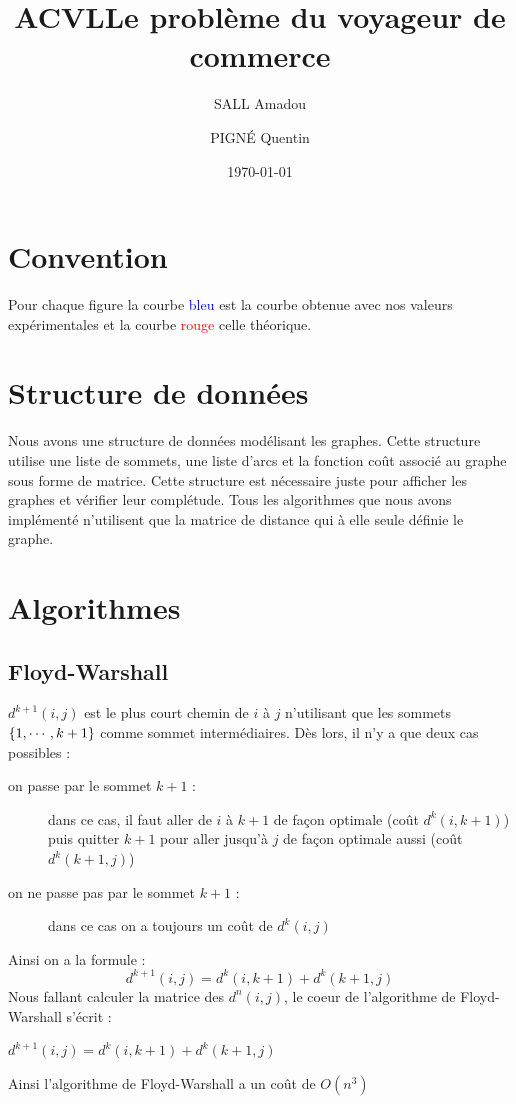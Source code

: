 \documentclass[11pt]{article} \usepackage[top=2cm, bottom=2cm, left=2cm, right=2cm]{geometry}
\title{ACVL} \title{Le problème du voyageur de commerce} \author{SALL Amadou \and PIGN\'E Quentin } \date{\today}
\begin{document}
\maketitle
\section{Convention}
Pour chaque figure la courbe \textcolor{blue}{bleu} est la courbe obtenue avec nos valeurs expérimentales et la courbe \textcolor{red}{rouge} celle théorique.
\section{Structure de données}
Nous avons une structure de données modélisant les graphes. Cette structure utilise une liste de sommets, une liste
d'arcs et la fonction coût associé au graphe sous forme de matrice. Cette structure est nécessaire juste pour afficher
les graphes et vérifier leur complétude. Tous les algorithmes que nous avons implémenté n'utilisent que la matrice de
distance qui à elle seule définie le graphe.
\section{Algorithmes}

\subsection*{Floyd-Warshall}
$d^{k+1}(i,j)$ est le plus court chemin de $i$ à $j$ n'utilisant que les sommets $\left\{1,\cdots,k+1\right\}$ comme sommet
intermédiaires. Dès lors, il n'y a que deux cas possibles :
\begin{description}
    \item[on passe par le sommet $k+1$ :]  dans ce cas, il faut aller de $i$ à $k+1$ de façon optimale (coût
  $d^{k}(i,k+1)$) puis quitter $k+1$ pour aller jusqu'à $j$ de façon optimale aussi (coût $d^{k}(k+1,j)$)
\item[on ne passe pas par le sommet $k+1$ :] dans ce cas on a toujours un coût de $d^{k}(i,j)$
\end{description}
Ainsi on a la formule :
\begin{displaymath}
  d^{k+1}(i,j) = d^{k}(i,k+1) + d^{k}(k+1,j) 
\end{displaymath}
Nous fallant calculer la matrice des $d^{n}(i,j)$, le coeur de l'algorithme de Floyd-Warshall s'écrit :
  \begin{algorithmic}[]
           \State $ d^{k+1}(i,j) = d^{k}(i,k+1) + d^{k}(k+1,j) $
           \EndFor
       \EndFor
   \EndFor
  \end{algorithmic}
Ainsi l'algorithme de Floyd-Warshall a un coût de $O(n^3)$
\end{document}
